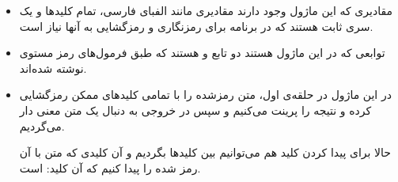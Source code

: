 \documentclass{article}
\begin{document}
\begin{itemize}
\item 
{}

مقادیری که این ماژول وجود دارند مقادیری مانند الفبای فارسی، تمام کلید‌ها و یک سری ثابت هستند که در برنامه برای رمزنگاری و رمزگشایی به آنها نیاز است.

\item {}

توابعی که در این ماژول هستند دو تابع 
و
هستند که طبق فرمول‌های رمز مستوی نوشته شده‌اند.

\item {}

در این ماژول در حلقه‌ی 
اول، متن رمزشده را با تمامی کلید‌های ممکن رمزگشایی کرده و نتیجه را پرینت می‌کنیم و سپس در خروجی به دنبال یک متن معنی دار می‌گردیم.

حالا برای پیدا کردن کلید هم می‌توانیم بین کلید‌ها بگردیم و آن کلیدی که متن با آن رمز شده را پیدا کنیم که آن کلید:
است.
\end{itemize}
\end{document}
